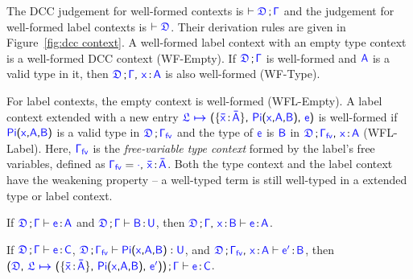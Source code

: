 The DCC judgement for well-formed contexts is $\vdash \targetcon$ and the judgement for well-formed label contexts is $\vdash \target{\fdef}$. Their derivation rules are given in Figure~\ref{fig:dcc context}. A well-formed label context with an empty type context is a well-formed DCC context (WF-Empty). 
If $\targetcon$ is well-formed and $\target{A}$ is a valid type in it, then $\target{\fdef} \semicolon \target{\Gamma} \sfcomma \itemtype{x}{A}$ is also well-formed (WF-Type). 

For label contexts, the empty context is well-formed (WFL-Empty). A label context extended with a new entry $\itemdef{\target{\flabel}}{\itemtype{\bar{x}}{\bar{A}}}{\targetpi{x}{A}{B}}{\target{e}}$ is well-formed if $\targetpi{x}{A}{B}$ is a valid type in $\target{\fdef} \semicolon \target{\Gamma_{fv}}$ and the type of $\target{e}$ is $\target{B}$ in $\target{\fdef} \semicolon \target{\Gamma_{fv}} \sfcomma \itemtype{x}{A}$ (WFL-Label). Here, $\target{\Gamma_{fv}}$ is the \textit{free-variable type context} formed by the label's free variables, defined as $\target{\Gamma_{fv}} = \target{\cdot} \sfcomma \itemtype{\bar{x}}{\bar{A}}$. Both the type context and the label context have the weakening property -- a well-typed term is still well-typed in a extended type or label context.

\begin{lemma} If $\targetcon \vdash \itemtype{e}{A}$ and $\targetcon \vdash \itemtype{B}{U}$, then $\targetcon \sfcomma \itemtype{x}{B} \vdash \itemtype{e}{A}$.
\end{lemma}

\begin{lemma} If $\targetcon \vdash \itemtype{e}{C}$,
$\target{\fdef}\semicolon \target{\Gamma_{fv}} \vdash \targetpi{x}{A}{B} \mathrel{:} \target{U}$, and
$\target{\fdef}\semicolon \target{\Gamma_{fv}}\sfcomma \itemtype{x}{A} \vdash \itemtype{e'}{B}$, then
$\sfpl \target{\fdef}\sfcomma \itemdef{\target{\flabel}}{\itemtype{\bar{x}}{\bar{A}}}{\targetpi{x}{A}{B}}{\target{e'}} \sfpr 
\semicolon \target{\Gamma} \vdash \itemtype{e}{C}
$.
\end{lemma}

